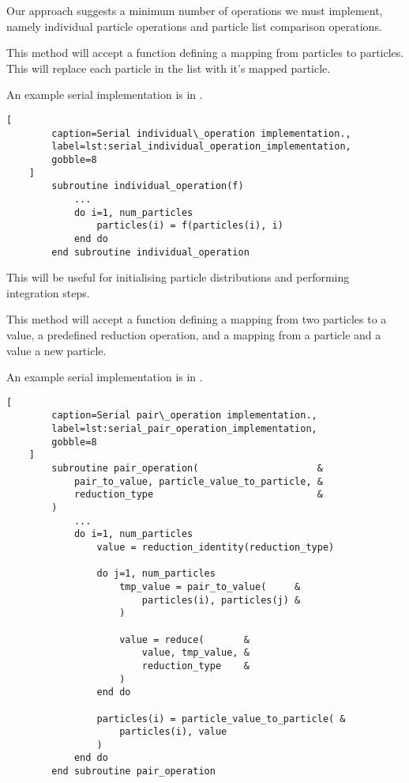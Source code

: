 %
Our approach suggests a minimum number of operations we must implement,
namely individual particle operations and particle list comparison
operations.
%
\begin{description}[style=nextline]
\item[individual\_operation]
    This method will accept a function defining a mapping from
    particles to particles.
    This will replace each particle in the list with it's mapped
    particle.

    An example serial implementation is in
    .

    \begin{lstlisting}[
        caption=Serial individual\_operation implementation.,
        label=lst:serial_individual_operation_implementation,
        gobble=8
    ]
        subroutine individual_operation(f)
            ...
            do i=1, num_particles
                particles(i) = f(particles(i), i)
            end do
        end subroutine individual_operation
    \end{lstlisting}
    
    This will be useful for initialising particle distributions
    and performing integration steps.

\item[pair\_operation]
    This method will accept a function defining a mapping from two
    particles to a value, a predefined reduction operation, and
    a mapping from a particle and a value a new particle.

    An example serial implementation is in
    .

    \begin{lstlisting}[
        caption=Serial pair\_operation implementation.,
        label=lst:serial_pair_operation_implementation,
        gobble=8
    ]
        subroutine pair_operation(                     &
            pair_to_value, particle_value_to_particle, &
            reduction_type                             &
        )
            ...
            do i=1, num_particles
                value = reduction_identity(reduction_type)

                do j=1, num_particles
                    tmp_value = pair_to_value(     &
                        particles(i), particles(j) &
                    )

                    value = reduce(       &
                        value, tmp_value, &
                        reduction_type    & 
                    )
                end do

                particles(i) = particle_value_to_particle( &
                    particles(i), value
                )
            end do
        end subroutine pair_operation
    \end{lstlisting}
\end  {description}


